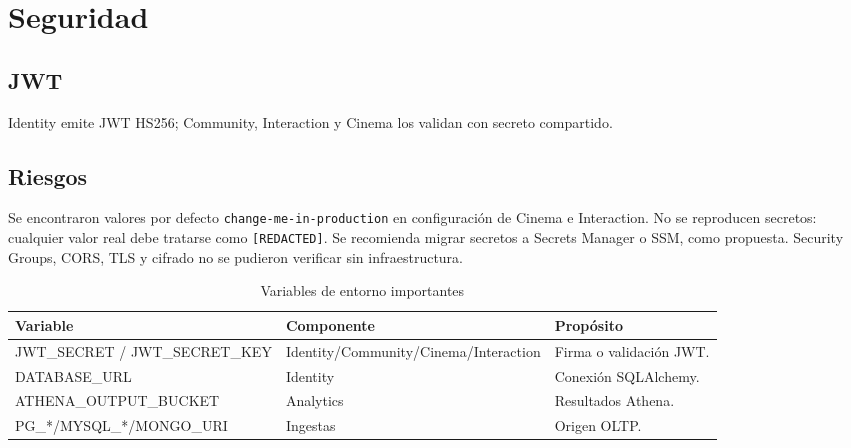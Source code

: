 \chapter{Seguridad}\section{JWT}Identity emite JWT HS256; Community, Interaction y Cinema los validan con secreto compartido.\section{Riesgos}Se encontraron valores por defecto \texttt{change-me-in-production} en configuración de Cinema e Interaction. No se reproducen secretos: cualquier valor real debe tratarse como \texttt{[REDACTED]}. Se recomienda migrar secretos a Secrets Manager o SSM, como propuesta. Security Groups, CORS, TLS y cifrado no se pudieron verificar sin infraestructura.\begin{table}[H]\centering\caption{Variables de entorno importantes}\begin{tabularx}{\textwidth}{l l X}\toprule Variable&Componente&Propósito\\\midrule JWT\_SECRET / JWT\_SECRET\_KEY&Identity/Community/Cinema/Interaction&Firma o validación JWT.\\DATABASE\_URL&Identity&Conexión SQLAlchemy.\\ATHENA\_OUTPUT\_BUCKET&Analytics&Resultados Athena.\\PG\_*/MYSQL\_*/MONGO\_URI&Ingestas&Origen OLTP.\\\bottomrule\end{tabularx}\end{table}
